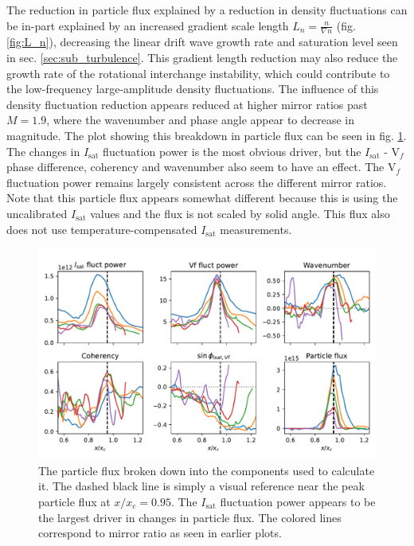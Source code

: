 The reduction in particle flux explained by a reduction in density fluctuations can be in-part explained by an increased gradient scale length $L_n = \frac{n}{\nabla n }$ (fig. \ref{fig:L_n}), decreasing the linear drift wave growth rate and saturation level seen in sec. \ref{sec:sub_turbulence}. This gradient length reduction may also reduce the growth rate of the rotational interchange instability, which could contribute to the low-frequency large-amplitude density fluctuations. The influence of this density fluctuation reduction appears reduced at higher mirror ratios past $M=1.9$, where the wavenumber and phase angle appear to decrease in magnitude. The plot showing this breakdown in particle flux can be seen in fig. \ref{fig_extra:particle_flux_breakdown}. The changes in $I_\text{sat}$ fluctuation power is the most obvious driver, but the $I_\text{sat}$ - V$_f$ phase difference, coherency and wavenumber also seem to have an effect. The V$_f$ fluctuation power remains largely consistent across the different mirror ratios. Note that this particle flux appears somewhat different because this is using the uncalibrated $I_\text{sat}$ values and the flux is not scaled by solid angle. This flux also does not use temperature-compensated $I_\text{sat}$ measurements.

\begin{figure}
    \centering
    \includegraphics[width=450pt]{figures/extra/particle_flux_breakdown.pdf}
    \caption[Particle flux: breakdown into components]{The particle flux broken down into the components used to calculate it. The dashed black line is simply a visual reference near the peak particle flux at $x/x_c=0.95$. The $I_\text{sat}$ fluctuation power appears to be the largest driver in changes in particle flux. The colored lines correspond to mirror ratio as seen in earlier plots.}
    \label{fig_extra:particle_flux_breakdown}
\end{figure}

